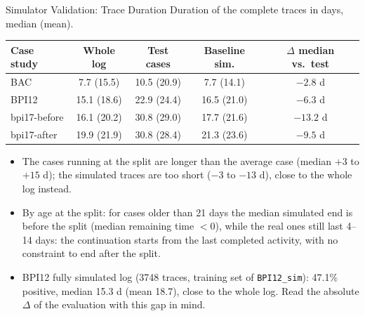 \documentclass[aspectratio=169]{beamer} %
\begin{document}
\begin{frame}{Simulator Validation: Trace Duration}
  \small
  Duration of the complete traces in days, median (mean).
  \begin{center}
  \begin{tabular}{lcccc}
    \toprule
    Case study & Whole log & Test cases & Baseline sim. & $\Delta$ median vs.\ test \\
    \midrule
    BAC          & 7.7 (15.5)  & 10.5 (20.9) & 7.7 (14.1)  & $-2.8$ d  \\
    BPI12        & 15.1 (18.6) & 22.9 (24.4) & 16.5 (21.0) & $-6.3$ d  \\
    bpi17-before & 16.1 (20.2) & 30.8 (29.0) & 17.7 (21.6) & $-13.2$ d \\
    bpi17-after  & 19.9 (21.9) & 30.8 (28.4) & 21.3 (23.6) & $-9.5$ d  \\
    \bottomrule
  \end{tabular}
  \end{center}
  \scriptsize
  \begin{itemize}
    \item The cases running at the split are \alert{longer} than the average case (median $+3$ to $+15$ d); the
      simulated traces are \alert{too short} ($-3$ to $-13$ d), close to the whole log instead.
    \item By age at the split: for cases older than 21 days the median simulated end is \alert{before the split}
      (median remaining time $< 0$), while the real ones still last 4--14 days: the continuation starts from the
      last completed activity, with no constraint to end after the split.
    \item BPI12 fully simulated log (3748 traces, training set of \texttt{BPI12\_sim}): 47.1\% positive, median
      15.3 d (mean 18.7), close to the whole log. Read the absolute $\Delta$ of the evaluation with this gap in mind.
  \end{itemize}
\end{frame}
\end{document}
